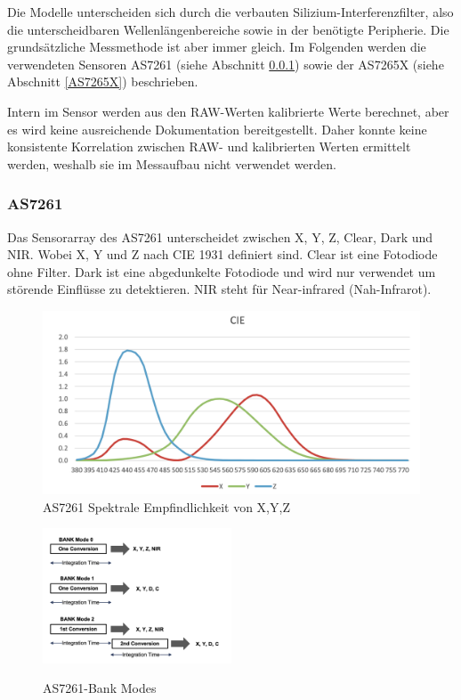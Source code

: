 \noindent Die Modelle unterscheiden sich durch die verbauten Silizium-Interferenzfilter, also die unterscheidbaren Wellenlängenbereiche sowie in der benötigte Peripherie.
Die grundsätzliche Messmethode ist aber immer gleich.
Im Folgenden werden die verwendeten Sensoren AS7261 (siehe Abschnitt \ref{AS7261}) sowie der AS7265X (siehe Abschnitt \ref{AS7265X}) beschrieben.

\noindent Intern im Sensor werden aus den RAW-Werten kalibrierte Werte berechnet, aber es wird keine ausreichende Dokumentation bereitgestellt.
Daher konnte keine konsistente Korrelation zwischen RAW- und kalibrierten Werten ermittelt werden, weshalb sie im Messaufbau nicht verwendet werden.


\newpage
\subsubsection{AS7261}\label{AS7261}
Das Sensorarray des AS7261 unterscheidet zwischen X, Y, Z, Clear, Dark und NIR.
Wobei X, Y und Z nach CIE 1931 definiert sind.
Clear ist eine Fotodiode ohne Filter.
Dark ist eine abgedunkelte Fotodiode und wird nur verwendet um störende Einflüsse zu detektieren.
NIR steht für Near-infrared  (Nah-Infrarot).\\

\begin{figure}[H]
  \centering
 \includegraphics[width=0.6\linewidth]{img/AS7261-Spectral_Responsivity.png}
  \caption{AS7261 Spektrale Empfindlichkeit von X,Y,Z \cite{Datenblatt_AS7261}}
  \label{fig:AS7261-Spectral_Responsivity}
\end{figure}


\begin{figure}
\centering
\includegraphics[width=0.5\textwidth]{img/AS7261-Bank_Modes.png}
\label{fig:AS7261-Bank_Modes}
\caption{AS7261-Bank Modes \cite{Datenblatt_AS7261}}
\end{figure}

